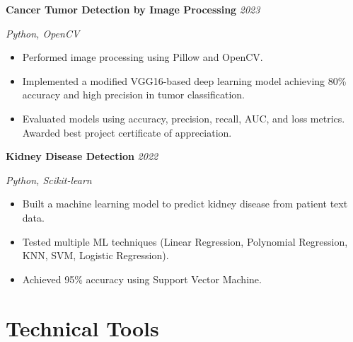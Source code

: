 \documentclass[a4paper,11pt]{article}
\newcommand{\cvproject}[2]{%
  \textbf{#1} \hfill \textit{#2}
  \vspace{2pt}
}
\begin{document}
\vspace{6pt}

\cvproject{Cancer Tumor Detection by Image Processing}{2023}
\newline \textit{Python, OpenCV}
\begin{itemize}[leftmargin=1.5em, topsep=2pt, itemsep=-5pt]
  \item Performed image processing using Pillow and OpenCV.
  \item Implemented a modified VGG16-based deep learning model achieving 80\% accuracy and high precision in tumor classification.
  \item Evaluated models using accuracy, precision, recall, AUC, and loss metrics. Awarded best project certificate of appreciation.
\end{itemize}

\vspace{6pt}

\newpage

\cvproject{Kidney Disease Detection}{2022}
\newline \textit{Python, Scikit-learn}
\begin{itemize}[leftmargin=1.5em, topsep=2pt, itemsep=-5pt]
  \item Built a machine learning model to predict kidney disease from patient text data.
  \item Tested multiple ML techniques (Linear Regression, Polynomial Regression, KNN, SVM, Logistic Regression).
  \item Achieved 95\% accuracy using Support Vector Machine.
\end{itemize}




\section{Technical Tools}
\end{document}
